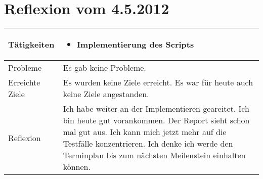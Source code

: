 
\begin{table}
\section{Reflexion vom 4.5.2012}
\begin{tabular}{| l | p{12cm} |}
    \hline
    Tätigkeiten &
    \begin{itemize}
        \item Implementierung des Scripts 
    \end{itemize}  \\
    \hline
    Probleme & 
    Es gab keine Probleme. \\
    \hline
    Erreichte Ziele &
    Es wurden keine Ziele erreicht. Es war für heute auch keine Ziele angestanden. \\
    \hline 
    Reflexion &
    Ich habe weiter an der Implementieren geareitet. Ich bin heute gut vorankommen. Der Report sieht schon mal gut aus. Ich kann mich jetzt mehr auf die Testfälle konzentrieren. Ich denke ich werde den Terminplan bis zum nächsten Meilenstein einhalten können. \\   
    \hline
\end{tabular}
\end{table}

\clearpage
